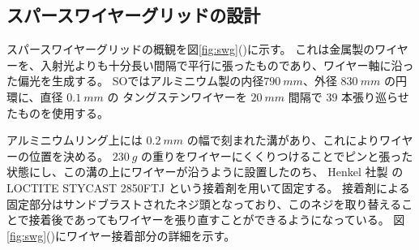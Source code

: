 \documentclass[../../main.tex]{subfiles}
\begin{document}
\subsection{スパースワイヤーグリッドの設計}
スパースワイヤーグリッドの概観を図\ref{fig:swg}()に示す。
これは金属製のワイヤーを、入射光よりも十分長い間隔で平行に張ったものであり、ワイヤー軸に沿った偏光を生成する。
SOではアルミニウム製の内径$\SI{790}{mm}$、外径 $\SI{830}{mm}$ の円環に、直径 $\SI{0.1}{mm}$ の
タングステンワイヤーを $\SI{20}{mm}$ 間隔で $39$ 本張り巡らせたものを使用する\cite{swg:murata}。

アルミニウムリング上には $\SI{0.2}{mm}$ の幅で刻まれた溝があり、これによりワイヤーの位置を決める。
$\SI{230}{g}$ の重りをワイヤーにくくりつけることでピンと張った状態にし、この溝の上にワイヤーが沿うように設置したのち、
Henkel 社製 の LOCTITE STYCAST 2850FTJ という接着剤を用いて固定する。
接着剤による固定部分はサンドブラストされたネジ頭となっており、このネジを取り替えることで接着後であってもワイヤーを張り直すことができるようになっている。
図\ref{fig:swg}()にワイヤー接着部分の詳細を示す。
\end{document}

